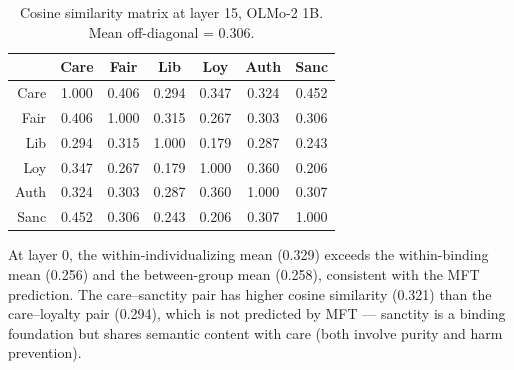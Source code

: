 \begin{table}[h]
\centering
\caption{Cosine similarity matrix at layer 15, OLMo-2 1B. Mean off-diagonal = 0.306.}
\label{tab:cosine_l15}
\small
\begin{tabular}{r ccc|ccc}
\toprule
     & Care & Fair & Lib & Loy & Auth & Sanc \\
\midrule
Care & 1.000 & 0.406 & 0.294 & 0.347 & 0.324 & 0.452 \\
Fair & 0.406 & 1.000 & 0.315 & 0.267 & 0.303 & 0.306 \\
Lib  & 0.294 & 0.315 & 1.000 & 0.179 & 0.287 & 0.243 \\
\midrule
Loy  & 0.347 & 0.267 & 0.179 & 1.000 & 0.360 & 0.206 \\
Auth & 0.324 & 0.303 & 0.287 & 0.360 & 1.000 & 0.307 \\
Sanc & 0.452 & 0.306 & 0.243 & 0.206 & 0.307 & 1.000 \\
\bottomrule
\end{tabular}
\end{table}

At layer 0, the within-individualizing mean (0.329) exceeds the
within-binding mean (0.256) and the between-group mean (0.258),
consistent with the MFT prediction. The care--sanctity pair has
higher cosine similarity (0.321) than the care--loyalty pair
(0.294), which is not predicted by MFT --- sanctity is a binding
foundation but shares semantic content with care (both involve
purity and harm prevention).
